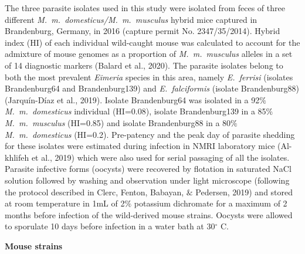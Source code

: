\documentclass[12pt]{article}
\renewcommand{\_}{\kern-1.5pt\textunderscore\kern-1.5pt}
\begin{document}
The three parasite isolates used in this study were isolated from feces of three different \textit{M. m. domesticus/M. m. musculus} hybrid mice captured in Brandenburg, Germany, in 2016 (capture permit No. 2347/35/2014). Hybrid index (HI) of each individual wild-caught mouse was calculated to account for the admixture of mouse genomes as a proportion of \textit{M. m. musculus} alleles in a set of 14 diagnostic markers (Balard et al., 2020). The parasite isolates belong to both the most prevalent \textit{Eimeria }species in this area, namely \textit{E. ferrisi }(isolates Brandenburg64 and Brandenburg139) and \textit{E. falciformis }(isolate Brandenburg88)(Jarquín-Díaz et al., 2019). Isolate Brandenburg64 was isolated in a 92$\%$  \textit{M. m. domesticus} individual (HI=0.08), isolate Brandenburg139 in a 85$\%$  \textit{M. m. musculus} (HI=0.85) and isolate Brandenburg88 in a 80$\%$  \textit{M. m. domesticus} (HI=0.2). Pre-patency and the peak day of parasite shedding for these isolates were estimated during infection in NMRI laboratory mice (Al-khlifeh et al., 2019) which were also used for serial passaging of all the isolates. Parasite infective forms (oocysts) were recovered by flotation in saturated NaCl solution followed by washing and observation under light microscope (following the protocol described in Clerc, Fenton, Babayan, $\&$  Pedersen, 2019) and stored at room temperature in 1mL of 2$\%$  potassium dichromate for a maximum of 2 months before infection of the wild-derived mouse strains. Oocysts were allowed to sporulate 10 days before infection in a water bath at 30$ ^{\circ} $ C.\par

\begin{FlushLeft}
{\fontsize{14pt}{16.8pt}\selectfont \textbf{Mouse strains}\par}
\end{FlushLeft}\par
\end{document}
